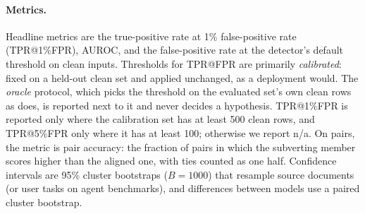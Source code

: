 \paragraph{Metrics.}
Headline metrics are the true-positive rate at 1\% false-positive rate (TPR@1\%FPR), AUROC, and the false-positive
rate at the detector's default threshold on clean inputs. Thresholds for TPR@FPR are primarily \emph{calibrated}:
fixed on a held-out clean set and applied unchanged, as a deployment would. The \emph{oracle} protocol, which picks the
threshold on the evaluated set's own clean rows as \citet{liu2026passing} does, is reported next to it and never
decides a hypothesis. TPR@1\%FPR is reported only where the calibration set has at least 500 clean rows, and
TPR@5\%FPR only where it has at least 100; otherwise we report n/a. On pairs, the metric is pair accuracy: the
fraction of pairs in which the subverting member scores higher than the aligned one, with ties counted as one half.
Confidence intervals are 95\% cluster bootstraps ($B{=}1000$) that resample source documents (or user tasks on agent
benchmarks), and differences between models use a paired cluster bootstrap.
